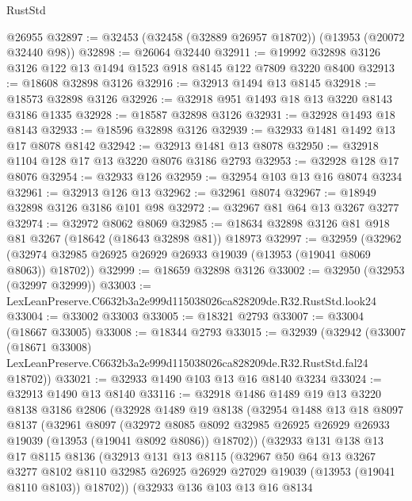 \begin{lexlean}{RustStd}
\begin{coremodule}
    @26955
@32897 := @32453 (@32458 (@32889 @26957 @18702)) (@13953 (@20072 @32440 @98))
@32898 := @26064 @32440
@32911 := @19992 @32898 @3126 @3126 @122 @13 @1494 @1523 @918 @8145 @122 @7809 @3220 @8400
@32913 := @18608 @32898 @3126
@32916 := @32913 @1494 @13 @8145
@32918 := @18573 @32898 @3126
@32926 := @32918 @951 @1493 @18 @13 @3220 @8143 @3186 @1335
@32928 := @18587 @32898 @3126
@32931 := @32928 @1493 @18 @8143
@32933 := @18596 @32898 @3126
@32939 := @32933 @1481 @1492 @13 @17 @8078 @8142
@32942 := @32913 @1481 @13 @8078
@32950 := @32918 @1104 @128 @17 @13 @3220 @8076 @3186 @2793
@32953 := @32928 @128 @17 @8076
@32954 := @32933 @126
@32959 := @32954 @103 @13 @16 @8074 @3234
@32961 := @32913 @126 @13
@32962 := @32961 @8074
@32967 := @18949 @32898 @3126 @3186 @101 @98
@32972 := @32967 @81 @64 @13 @3267 @3277
@32974 := @32972 @8062 @8069
@32985 := @18634 @32898 @3126 @81 @918 @81 @3267 (@18642 (@18643 @32898 @81)) @18973
@32997 := @32959
    (@32962 (@32974 @32985 @26925 @26929 @26933 @19039 (@13953 (@19041 @8069 @8063)) @18702))
@32999 := @18659 @32898 @3126
@33002 := @32950 (@32953 (@32997 @32999))
@33003 := LexLeanPreserve.C6632b3a2e999d115038026ca828209de.R32.RustStd.look24
@33004 := @33002 @33003
@33005 := @18321 @2793
@33007 := @33004 (@18667 @33005)
@33008 := @18344 @2793
@33015 := @32939
    (@32942
      (@33007
        (@18671 @33008)
        LexLeanPreserve.C6632b3a2e999d115038026ca828209de.R32.RustStd.fal24
        @18702))
@33021 := @32933 @1490 @103 @13 @16 @8140 @3234
@33024 := @32913 @1490 @13 @8140
@33116 := @32918
    @1486
    @1489
    @19
    @13
    @3220
    @8138
    @3186
    @2806
    (@32928
      @1489
      @19
      @8138
      (@32954
        @1488
        @13
        @18
        @8097
        @8137
        (@32961
          @8097
          (@32972
            @8085
            @8092
            @32985
            @26925
            @26929
            @26933
            @19039
            (@13953 (@19041 @8092 @8086))
            @18702))
        (@32933
          @131
          @138
          @13
          @17
          @8115
          @8136
          (@32913
            @131
            @13
            @8115
            (@32967
              @50
              @64
              @13
              @3267
              @3277
              @8102
              @8110
              @32985
              @26925
              @26929
              @27029
              @19039
              (@13953 (@19041 @8110 @8103))
              @18702))
          (@32933
            @136
            @103
            @13
            @16
            @8134

\end{coremodule}
\end{lexlean}
